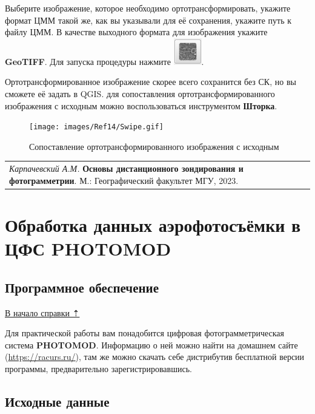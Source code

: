 \documentclass[
  12pt,
]{book}
\begin{document}
Выберите изображение, которое необходимо ортотрансформировать, укажите формат ЦММ такой же, как вы указывали для её сохранения, укажите путь к файлу ЦММ. В качестве выходного формата для изображения укажите \textbf{GeoTIFF}. Для запуска процедуры нажмите \includegraphics{images/Ref14/Run.png}.

Ортотрансформированное изображение скорее всего сохранится без СК, но вы сможете её задать в QGIS. для сопоставления ортотрансформированного изображения с исходным можно воспользоваться инструментом \textbf{Шторка}.

\begin{figure}
\centering
\texttt{[image: images/Ref14/Swipe.gif]}
\caption{Сопоставление ортотрансформированного изображения с исходным}
\end{figure}

\begin{longtable}[]{@{}l@{}}
\toprule\noalign{}
\endhead
\bottomrule\noalign{}
\endlastfoot
\emph{Карпачевский А.М.} \textbf{Основы дистанционного зондирования и фотограмметрии}. М.: Географический факультет МГУ, 2023. \\
\end{longtable}

\hypertarget{photomod}{%
\chapter{Обработка данных аэрофотосъёмки в ЦФС PHOTOMOD}\label{photomod}}

\hypertarget{photomod-soft}{%
\section{Программное обеспечение}\label{photomod-soft}}

\protect\hyperlink{photomod}{В начало справки ⇡}

Для практической работы вам понадобится цифровая фотограмметрическая система \textbf{PHOTOMOD}. Информацию о ней можно найти на домашнем сайте (\url{https://racurs.ru/}), там же можно скачать себе дистрибутив бесплатной версии программы, предварительно зарегистрировавшись.

\hypertarget{photomod-initial}{%
\section{Исходные данные}\label{photomod-initial}}
\end{document}
